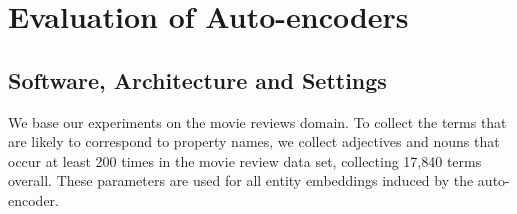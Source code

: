













\section{Evaluation of Auto-encoders}

\subsection{Software, Architecture and Settings}\label{howto}

We base our experiments on the movie reviews domain. To collect the terms that are likely to correspond to property names, we collect adjectives and nouns that occur at least 200 times in the movie review data set, collecting 17,840 terms overall.  These parameters are used for all entity embeddings induced by the auto-encoder. 

